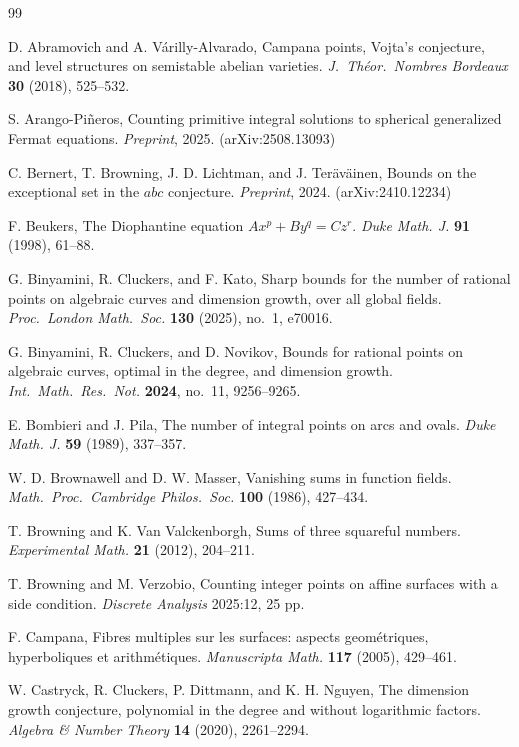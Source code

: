 \documentclass[a4paper,11pt,twoside,reqno]{amsart}
\theoremstyle{definition}
\theoremstyle{remark}
\numberwithin{equation}{section}
\newcommand\1{\mathbf{1}}
\begin{document}
\begin{thebibliography}{99} 

D. Abramovich and A. V\'arilly-Alvarado,
Campana points, Vojta's conjecture, and level structures on semistable abelian varieties.
{\em J.\ Th\'eor.\ Nombres Bordeaux} {\bf 30} (2018), 525--532.

S. Arango-Pi\~neros,
Counting primitive integral solutions to spherical generalized Fermat equations.
{\em Preprint}, 2025. (arXiv:2508.13093)

C. Bernert, T. Browning, J. D. Lichtman, and J. Ter\"av\"ainen,
Bounds on the exceptional set in the $abc$ conjecture.
{\em Preprint}, 2024. (arXiv:2410.12234)

F. Beukers,
The Diophantine equation $Ax^p+By^q=Cz^r$.
{\em Duke Math. J.} {\bf 91} (1998), 61--88.

G. Binyamini, R. Cluckers, and F. Kato,
Sharp bounds for the number of rational points on algebraic curves and dimension growth, over all global fields.
{\em Proc.\ London Math.\ Soc.} {\bf 130} (2025), no.~1, e70016.

G. Binyamini, R. Cluckers, and D. Novikov,
Bounds for rational points on algebraic curves, optimal in the degree, and dimension growth.
{\em Int.\ Math.\ Res.\ Not.} {\bf 2024}, no.~11, 9256--9265.

E. Bombieri and J. Pila,
The number of integral points on arcs and ovals.
{\em Duke Math. J.} {\bf 59} (1989), 337--357.

W. D. Brownawell and D. W. Masser,
Vanishing sums in function fields.
{\em Math.\ Proc.\ Cambridge Philos.\ Soc.} {\bf 100} (1986), 427--434.

 T. Browning and K. Van Valckenborgh, Sums of three squareful numbers. {\em Experimental Math.} \textbf{21} (2012), 204--211.

T. Browning and M. Verzobio,
 Counting integer points on affine surfaces with a side condition.
{\em Discrete Analysis} 2025:12, 25 pp.

F. Campana,
Fibres multiples sur les surfaces: aspects geom\'etriques,
 hyperboliques et arith\-m\'etiques.
{\em Manuscripta Math.}
{\bf 117} (2005), {429--461}.

W. Castryck, R. Cluckers, P. Dittmann, and K. H. Nguyen,
The dimension growth conjecture, polynomial in the degree and without logarithmic factors.
{\em Algebra \& Number Theory} {\bf 14} (2020), 2261--2294.


\end{thebibliography}
\end{document}
